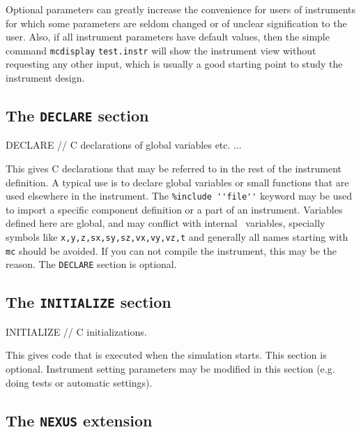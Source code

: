 Optional parameters can greatly increase the convenience for users of
instruments for which some parameters are seldom changed or of unclear
signification to the user. Also, if all instrument parameters have default
values, then the simple command \verb+mcdisplay+ \verb+test.instr+ will show the
instrument view without requesting any other input, which is usually a good
starting point to study the instrument design.

\subsection{The \texttt{DECLARE} section}
\label{s:declare}

\begin{mcstas}
DECLARE
   // C declarations of global variables etc. ...
\end{mcstas} 
 This gives C declarations that may be
referred to in the rest of the instrument definition. A typical use is to
declare global variables or small functions that are used elsewhere in the
instrument. The \verb+%include ''file''+ keyword may be used to import a
specific
component definition or a part of an instrument. Variables defined here are
global, and may conflict with internal \MCS\ variables, specially symbols like
\verb+x,y,z,sx,sy,sz,vx,vy,vz,t+ and generally all names starting with \verb+mc+
should be avoided. If you can not compile the instrument, this may be the
reason. The \texttt{DECLARE} section is optional.

\subsection{The \texttt{INITIALIZE} section}
\label{s:initialize}

\begin{mcstas}
INITIALIZE
// C initializations. 
\end{mcstas} 
 This gives code that is executed when the
simulation starts. This section is optional. Instrument setting parameters may
be modified in this section (e.g. doing tests or automatic settings).

\subsection{The \texttt{NEXUS} extension}
   
\label{s:nexus}


